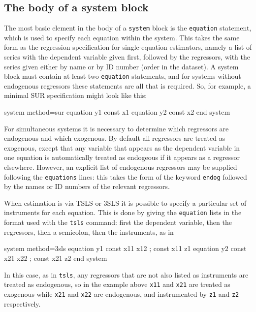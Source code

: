 \subsection{The body of a system block}

The most basic element in the body of a \texttt{system} block is the
\texttt{equation} statement, which is used to specify each equation
within the system. This takes the same form as the regression
specification for single-equation estimators, namely a list of series
with the dependent variable given first, followed by the regressors,
with the series given either by name or by ID number (order in the
dataset). A system block must contain at least two \texttt{equation}
statements, and for systems without endogenous regressors these
statements are all that is required. So, for example, a minimal
SUR specification might look like this:

\begin{code}
system method=sur
  equation y1 const x1
  equation y2 const x2
end system
\end{code}

For simultaneous systems it is necessary to determine which regressors
are endogenous and which exogenous. By default all regressors are
treated as exogenous, except that any variable that appears as the
dependent variable in one equation is automatically treated as
endogeous if it appears as a regressor elsewhere. However, an explicit
list of endogenous regressors may be supplied following the
\texttt{equations} lines: this takes the form of the keyword
\texttt{endog} followed by the names or ID numbers of the relevant
regressors.

When estimation is via TSLS or 3SLS it is possible to specify a
particular set of instruments for each equation. This is done by
giving the \texttt{equation} lists in the format used with the
\texttt{tsls} command: first the dependent variable, then the
regressors, then a semicolon, then the instruments, as in

\begin{code}
system method=3sls
  equation y1 const x11 x12 ; const x11 z1
  equation y2 const x21 x22 ; const x21 z2
end system
\end{code}

In this case, as in \texttt{tsls}, any regressors that are not also
listed as instruments are treated as endogenous, so in the example
above \texttt{x11} and \texttt{x21} are treated as exogenous while
\texttt{x21} and \texttt{x22} are endogenous, and instrumented by
\texttt{z1} and \texttt{z2} respectively.

